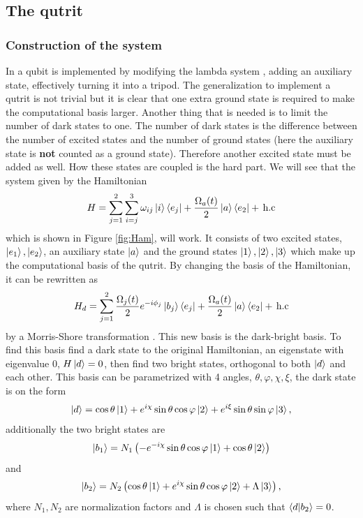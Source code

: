 \subsection{The qutrit}
\subsubsection{Construction of the system}
In \cite{darkpath} a qubit is implemented by modifying the lambda system \cite{lambda}, adding an auxiliary state, effectively turning it into a tripod. The generalization to implement a qutrit is not trivial but it is clear that one extra ground state is required to make the computational basis larger. Another thing that is needed is to limit the number of dark states to one. The number of dark states is the difference between the number of excited states and the number of ground states \cite{lambda} (here the auxiliary state is \textbf{not} counted as a ground state). Therefore another excited state must be added as well. How these states are coupled is the hard part. We will see that the system given by the Hamiltonian
\begin{equation}
\label{eq:Ham}
H = \sum_{j = 1}^2 \sum_{i =j}^{3} \omega_{ij}\ket{i}\bra{e_j}  + \frac{\Omega_{a}(t)}{2}\ket{a}\bra{e_2}  +\,\text{h.c}
\end{equation}
which is shown in Figure \ref{fig:Ham}, will work.  It consists of two excited states, $\ket{e_1}, \ket{e_2}$, an auxiliary state $\ket{a}$ and the ground states $\ket{1}, \ket{2}, \ket{3}$ which 
make up the computational basis of the qutrit. By changing the basis of the Hamiltonian, it can be rewritten as 
\begin{equation}
\label{eq:Hamd}
H_d = \sum_{j = 1}^2 \frac{\Omega_j(t)}{2}e^{-i\phi_j}\ket{b_j}\bra{e_j}  + \frac{\Omega_a(t)}{2}\ket{a}\bra{e_2}  +\,\text{h.c}
\end{equation} 
by a Morris-Shore transformation \cite{morris}. This new basis is the dark-bright basis. To find this basis find a dark state to the original  Hamiltonian, an eigenstate with eigenvalue $0$, $H\ket{d} = 0$, then find two bright states, orthogonal to both $\ket{d}$ and each other. This basis can be parametrized with 4 angles, $\theta, \varphi, \chi, \xi$, the dark state is on the form 
\begin{equation}
\ket{d} = \cos\theta\ket{1} + e^{i\chi}\sin\theta\cos\varphi\ket{2} + e^{i\xi}\sin\theta\sin\varphi\ket{3},
\end{equation}
additionally the two bright states are 
\begin{equation}
\ket{b_1} = N_1 \left(-e^{-i\chi}\sin\theta\cos\varphi\ket{1} + \cos\theta\ket{2}\right)
\end{equation} 
and
\begin{equation}
\ket{b_2} = N_2 \left(\cos\theta\ket{1} +  e^{i\chi}\sin\theta\cos\varphi\ket{2} + \Lambda \ket{3}\right),
\end{equation} where $N_1, N_2$ are normalization factors and $\Lambda$ is chosen such that $\bra{d}\ket{b_2} = 0$.

